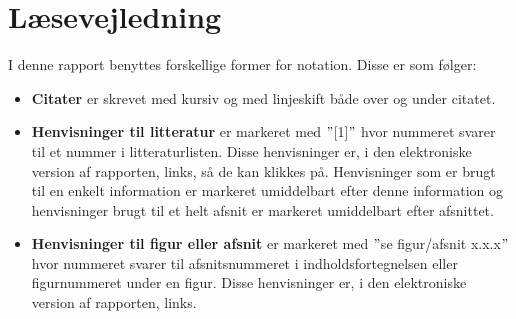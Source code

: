 \section*{Læsevejledning}
I denne rapport benyttes forskellige former for notation. Disse er som følger:

\begin{itemize}
\item \textbf{Citater} er skrevet med kursiv og med linjeskift både over og under citatet.

\item \textbf{Henvisninger til litteratur} er markeret med $"$[1]$"$ hvor nummeret svarer til et nummer i litteraturlisten. Disse henvisninger er, i den elektroniske version af rapporten, links, så de kan klikkes på. Henvisninger som er brugt til en enkelt information er markeret umiddelbart efter denne information og henvisninger brugt til et helt afsnit er markeret umiddelbart efter afsnittet.

\item \textbf{Henvisninger til figur eller afsnit} er markeret med $"$se figur/afsnit x.x.x$"$ hvor nummeret svarer til afsnitsnummeret i indholdsfortegnelsen eller figurnummeret under en figur. Disse henvisninger er, i den elektroniske version af rapporten, links.

\end{itemize}